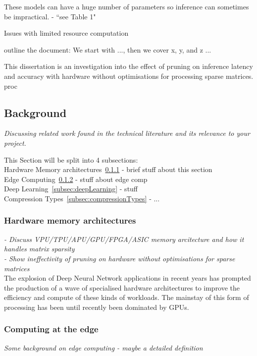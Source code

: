 \documentclass[11pt]{article}
\begin{document}
These models can have a huge number of parameters so inference can sometimes be impractical.
\autocite{chenDeepLearningMobile2020} - ``see Table 1"

Issues with limited resource computation \autocite{szeEfficientProcessingDeep2017}

outline the document: We start with ..., then we cover x, y, and z ...

This dissertation is an investigation into the effect of pruning on inference latency and accuracy with 
hardware without optimisations for processing sparse matrices. proc

\pagebreak
\subsection{Background}
\emph{Discussing related work found in the technical literature and its relevance to your
project.}

This Section will be split into 4 subsections:\\
Hardware Memory architectures~\ref{subsec:hardwareArch} - brief stuff about this section\\
Edge Computing~\ref{subsec:edgeComputing} - stuff about edge comp\\
Deep Learning~\ref{subsec:deepLearning} - stuff\\
Compression Types~\ref{subsec:compressionTypes} - ...\\


\subsubsection{Hardware memory architectures}\label{subsec:hardwareArch}
\emph{
- Discuss VPU/TPU/APU/GPU/FPGA/ASIC memory arcitecture and how it handles matrix sparsity\\
- Show ineffectivity of pruning on hardware without optimisations for sparse matrices\\
}
The explosion of Deep Neural Network applications in recent years has prompted the production of a wave of specialised hardware architectures to improve the efficiency and compute of these kinds of workloads. The mainstay of this form of processing has been until recently been dominated by GPUs.\\

\subsubsection{Computing at the edge}\label{subsec:edgeComputing}
\emph{Some background on edge computing - maybe a detailed definition\\}
\end{document}
